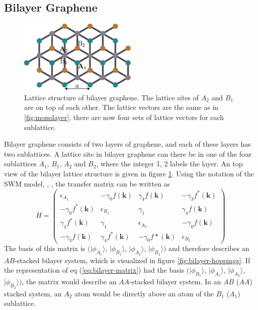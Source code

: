 \subsection{Bilayer Graphene}
\begin{figure}
\centering
\includegraphics[width=0.5\textwidth]{figure/numericalframework/graphene_lattice_bi_layer_top_csch}
\caption{Lattice structure of bilayer graphene. The lattice sites of $A_2$ and $B_1$ are on top of each other. The lattice vectors are the same as in \ref{fig:monolayer}, there are now four sets of lattice vectors for each sublattice.}\label{fig:bilayer-lattice}
\end{figure}
Bilayer graphene consists of two layers of graphene, and each of these layers has two sublattices. A lattice site in bilayer graphene can there be in one of the four sublattices $A_1$, $B_1$, $A_2$ and $B_2$, where the integer 1, 2 labels the layer. An top view of the bilayer lattice structure is given in figure \ref{fig:bilayer-lattice}. Using the notation of the SWM model, \cite{McClure1957}, \cite{McClure1960}, the transfer matrix can be written as
\begin{equation}
H =  \begin{pmatrix} \epsilon_{A_1} & - \gamma_0 f \left( \mathbf{k} \right) & \gamma_4 f \left( \mathbf{k} \right) & - \gamma_3 f^*\left( \mathbf{k} \right) \\
- \gamma_0 f^* \left( \mathbf{k} \right) & \epsilon_{B_1} & \gamma_1 & \gamma_4 f \left( \mathbf{k} \right) \\
\gamma_4 f^* \left( \mathbf{k} \right) & \gamma_1 & \epsilon_{A_2} & - \gamma_0 f \left( \mathbf{k} \right)  \\
- \gamma_3 f \left( \mathbf{k} \right) & \gamma_4 f^* \left( \mathbf{k} \right)& -\gamma_0 f* \left( \mathbf{k} \right)& \epsilon_{B_2} \end{pmatrix} \label{eq:bilayer-matrix}
\end{equation}
The basis  of this matrix is  $( |\phi_{A_1}\rangle$, $|\phi_{B_1}\rangle$, $|\phi_{A_2}\rangle$, $|\phi_{B_2}\rangle )$ and therefore describes an $AB$-stacked bilayer system, which is visualized in figure \ref{fig:bilayer-hoppings}. If the representation of eq (\ref{eq:bilayer-matrix}) had the basis $( |\phi_{B_1}\rangle$, $|\phi_{A_1}\rangle$, $|\phi_{A_2}\rangle$, $|\phi_{B_2}\rangle )$, the matrix would describe an $AA$-stacked bilayer system. %
In an $AB$ ($AA$) stacked system, an $A_2$ atom would be directly above an atom of the $B_1$ ($A_1$) sublattice.

